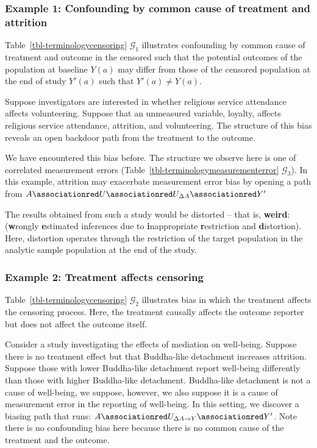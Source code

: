 \documentclass[
  single column]{article}
\begin{document}
\subsubsection{Example 1: Confounding by common cause of treatment and
attrition}\label{example-1-confounding-by-common-cause-of-treatment-and-attrition}

Table~\ref{tbl-terminologycensoring} \(\mathcal{G}_1\) illustrates
confounding by common cause of treatment and outcome in the censored
such that the potential outcomes of the population at baseline \(Y(a)\)
may differ from those of the censored population at the end of study
\(Y'(a)\) such that \(Y'(a) \neq Y(a)\).

Suppose investigators are interested in whether religious service
attendance affects volunteering. Suppose that an unmeasured variable,
loyalty, affects religious service attendance, attrition, and
volunteering. The structure of this bias reveals an open backdoor path
from the treatment to the outcome.

We have encountered this bias before. The structure we observe here is
one of correlated measurement errors
(Table~\ref{tbl-terminologymeasurementerror} \(\mathcal{G}_3\)). In this
example, attrition may exacerbate measurement error bias by opening a
path from
\(A \associationred U \associationred U_{\Delta{A}}  \associationred Y'\)

The results obtained from such a study would be distorted -- that is,
\textbf{weird}: (\textbf{w}rongly \textbf{e}stimated inferences due to
\textbf{i}nappropriate \textbf{r}estriction and \textbf{d}istortion).
Here, distortion operates through the restriction of the target
population in the analytic sample population at the end of the study.

\subsubsection{Example 2: Treatment affects
censoring}\label{example-2-treatment-affects-censoring}

Table~\ref{tbl-terminologycensoring} \(\mathcal{G}_2\) illustrates bias
in which the treatment affects the censoring process. Here, the
treatment causally affects the outcome reporter but does not affect the
outcome itself.

Consider a study investigating the effects of mediation on well-being.
Suppose there is no treatment effect but that Buddha-like detachment
increases attrition. Suppose those with lower Buddha-like detachment
report well-being differently than those with higher Buddha-like
detachment. Buddha-like detachment is not a cause of well-being, we
suppose, however, we also suppose it is a cause of measurement error in
the reporting of well-being. In this setting, we discover a biasing path
that runs: \(A \associationred U_{\Delta{A\to Y}}  \associationred Y'\).
Note there is no confounding bias here because there is no common cause
of the treatment and the outcome.
\end{document}
